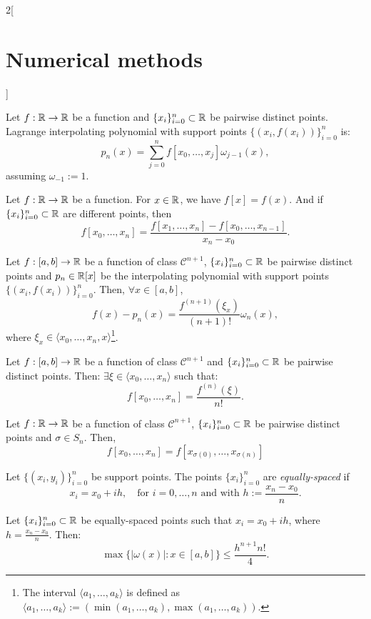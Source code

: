 \documentclass[../../../main.tex]{subfiles}
\begin{document}
\begin{multicols}{2}[\section{Numerical methods}]
\begin{prop}
    Let $f:\mathbb{R}\rightarrow\mathbb{R}$ be a function and $\{x_i\}_{i=0}^n\subset\mathbb{R}$ be pairwise distinct points. Lagrange interpolating polynomial with support points $\{(x_i,f(x_i))\}_{i=0}^n$ is: $$p_n(x)=\sum_{j=0}^nf[x_0,\ldots,x_j]\omega_{j-1}(x),$$ assuming $\omega_{-1}:=1$.
\end{prop}
\begin{method}
    Let $f:\mathbb{R}\rightarrow\mathbb{R}$ be a function. For $x\in\mathbb{R}$, we have $f[x]=f(x)$. And if $\{x_i\}_{i=0}^n\subset\mathbb{R}$ are different points, then $$f[x_0,\ldots,x_n]=\frac{f[x_1,\ldots,x_n]-f[x_0,\ldots,x_{n-1}]}{x_n-x_0}.$$ 
\end{method}
\begin{theorem}
    Let $f:[a,b]\rightarrow\mathbb{R}$ be a function of class $\mathcal{C}^{n+1}$, $\{x_i\}_{i=0}^n\subset\mathbb{R}$ be pairwise distinct points and $p_n\in\mathbb{R}[x]$ be the interpolating polynomial with support points $\{(x_i,f(x_i))\}_{i=0}^n$. Then, $\forall x\in[a,b]$, $$f(x)-p_n(x)=\frac{f^{(n+1)}(\xi_x)}{(n+1)!}\omega_n(x),$$ where $\xi_x\in\langle x_0,\ldots,x_n,x\rangle$\footnote{The interval $\langle a_1,\ldots,a_k\rangle$ is defined as $\langle a_1,\ldots,a_k\rangle:=(\min(a_1,\ldots,a_k),\max(a_1,\ldots,a_k))$.}.
\end{theorem}
\begin{lemma}
    Let $f:[a,b]\rightarrow\mathbb{R}$ be a function of class $\mathcal{C}^{n+1}$ and $\{x_i\}_{i=0}^n\subset\mathbb{R}$ be pairwise distinct points. Then: $\exists\xi\in\langle x_0,\ldots,x_n\rangle$ such that: $$f[x_0,\ldots,x_n]=\frac{f^{(n)}(\xi)}{n!}.$$ 
\end{lemma}
\begin{prop}
    Let $f:\mathbb{R}\rightarrow\mathbb{R}$ be a function of class $\mathcal{C}^{n+1}$, $\{x_i\}_{i=0}^n\subset\mathbb{R}$ be pairwise distinct points and $\sigma\in S_n$. Then, $$f[x_0,\ldots,x_n]=f[x_{\sigma(0)},\ldots,x_{\sigma(n)}]$$
\end{prop}
\begin{definition}
    Let $\{(x_i,y_i)\}_{i=0}^n$ be support points. The points $\{x_i\}_{i=0}^n$ are \textit{equally-spaced} if $$x_i=x_0+ih,\quad\text{for }i=0,\ldots,n\text{ and with }h:=\frac{x_n-x_0}{n}.$$
\end{definition}
\begin{prop}
    Let $\{x_i\}_{i=0}^n\subset\mathbb{R}$ be equally-spaced points such that $x_i=x_0+ih$, where $h=\frac{x_n-x_0}{n}$. Then:
    $$\max\{|\omega(x)|:x\in[a,b]\}\leq\frac{h^{n+1}n!}{4}.$$

\end{prop}
\end{multicols}
\end{document}
